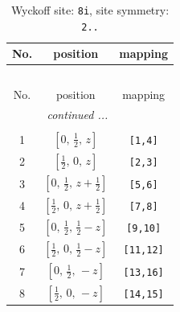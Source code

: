 \documentclass[fleqn,8pt]{jsarticle}
\begin{document}
\renewcommand{\arraystretch}{1.2}
\begin{longtable}{ccc}
\caption{Wyckoff site: {\tt 8i}, site symmetry: {\tt 2..}}
 \\
 \hline \hline
No. & position & mapping \\ \hline \endfirsthead

\multicolumn{2}{l}{\tablename\ \thetable{}} \\
 \hline \hline
No. & position & mapping \\ \hline \endhead

 \hline \hline
\multicolumn{2}{r}{\footnotesize\it continued ...} \\ \endfoot

 \hline \hline
\multicolumn{2}{r}{} \\ \endlastfoot

1 & $\left[ 0,\, \frac{1}{2},\, z \right]$ & {\tt [1,4]} \\ \hline
2 & $\left[ \frac{1}{2},\, 0,\, z \right]$ & {\tt [2,3]} \\ \hline
3 & $\left[ 0,\, \frac{1}{2},\, z + \frac{1}{2} \right]$ & {\tt [5,6]} \\ \hline
4 & $\left[ \frac{1}{2},\, 0,\, z + \frac{1}{2} \right]$ & {\tt [7,8]} \\ \hline
5 & $\left[ 0,\, \frac{1}{2},\, \frac{1}{2} - z \right]$ & {\tt [9,10]} \\ \hline
6 & $\left[ \frac{1}{2},\, 0,\, \frac{1}{2} - z \right]$ & {\tt [11,12]} \\ \hline
7 & $\left[ 0,\, \frac{1}{2},\, - z \right]$ & {\tt [13,16]} \\ \hline
8 & $\left[ \frac{1}{2},\, 0,\, - z \right]$ & {\tt [14,15]} \\
\end{longtable}
\renewcommand{\arraystretch}{1.2}
\end{document}
